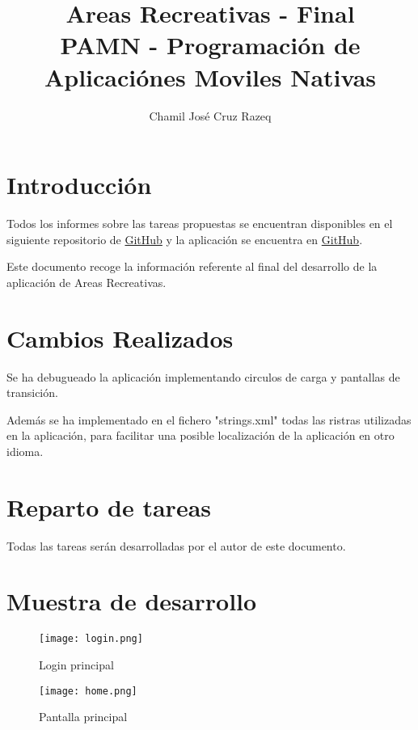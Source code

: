\documentclass{article}
\title{Areas Recreativas - Final \\[3ex] \small PAMN - Programación de Aplicaciónes Moviles Nativas}
\author{Chamil José Cruz Razeq}
\begin{document}
    \maketitle
    \thispagestyle{empty}
    \newpage

    \section{Introducción}

    Todos los informes sobre las tareas propuestas se encuentran disponibles en el
     siguiente repositorio de \href{https://github.com/chamilstudy/ulpgc_pamn_labs}{GitHub}
     y la aplicación se encuentra en \href{https://github.com/chamilstudy/pamn_proyecto_final}{GitHub}.

    Este documento recoge la información referente al final del desarrollo de la
     aplicación de Areas Recreativas.

    \section{Cambios Realizados}

    Se ha debugueado la aplicación implementando circulos de carga y pantallas de transición.
    
    Además se ha implementado en el fichero "strings.xml" todas las ristras utilizadas en
     la aplicación, para facilitar una posible localización de la aplicación en otro idioma.

    \section{Reparto de tareas}

    Todas las tareas serán desarrolladas por el autor de este documento.

    \section{Muestra de desarrollo}

    \begin{figure}[H]
        \centerline{\texttt{[image: login.png]}}
        \caption{Login principal}
        \label{fig:login}
    \end{figure}

    \begin{figure}[H]
        \centerline{\texttt{[image: home.png]}}
        \caption{Pantalla principal}
        \label{fig:home}
    \end{figure}
\end{document}
